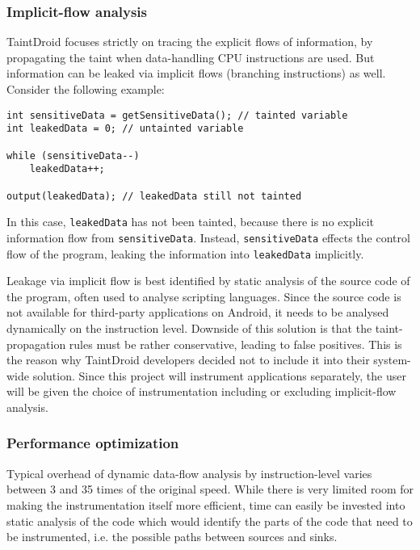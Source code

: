 \documentclass[12pt]{article}
\begin{document}
\subsubsection*{Implicit-flow analysis}

TaintDroid focuses strictly on tracing the explicit flows of information, 
by propagating the taint when data-handling CPU instructions are used. 
But information can be leaked via implicit flows (branching instructions) 
as well. Consider the following example:

\begin{verbatim}
int sensitiveData = getSensitiveData(); // tainted variable
int leakedData = 0; // untainted variable

while (sensitiveData--)
    leakedData++;

output(leakedData); // leakedData still not tainted
\end{verbatim}

In this case, \verb|leakedData| has not been tainted, because there is 
no explicit information flow from \verb|sensitiveData|. Instead, 
\verb|sensitiveData| effects the control flow of the program, leaking
the information into \verb|leakedData| implicitly. 

Leakage via implicit flow is best identified by static analysis of the 
source code of the program, often used to analyse scripting languages. 
Since the source code is not available for third-party applications on 
Android, it needs to be analysed dynamically on the instruction level.
Downside of this solution is that the taint-propagation rules must be
rather conservative, leading to false positives. This is the reason why
TaintDroid developers decided not to include it into their system-wide
solution. Since this project will instrument applications separately, 
the user will be given the choice of instrumentation including or 
excluding implicit-flow analysis.

\subsubsection*{Performance optimization}

Typical overhead of dynamic data-flow analysis by instruction-level 
varies between 3 and 35 times of the original speed. While there is
very limited room for making the instrumentation itself more efficient,
time can easily be invested into static analysis of the code which would
identify the parts of the code that need to be instrumented, i.e. the 
possible paths between sources and sinks. 
\end{document}

